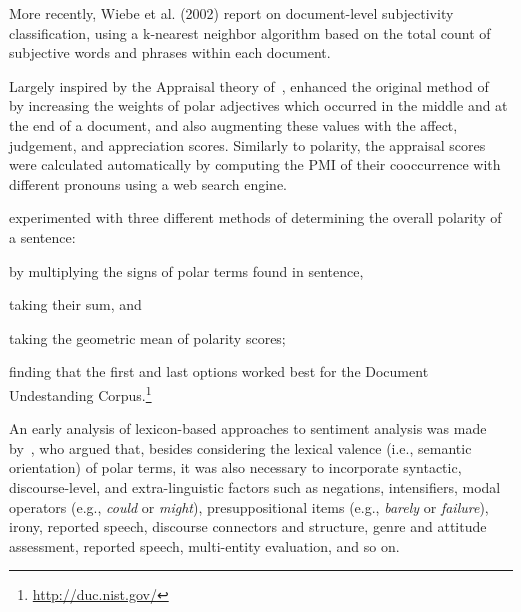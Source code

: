 \todo[inline]{}

More recently, Wiebe et al.  (2002) report on document-level
subjectivity classification, using a k-nearest neighbor algorithm
based on the total count of subjective words and phrases within each
document.


\todo[inline]{}

Largely inspired by the Appraisal theory of~\citet{Martin:00},
\citet{Taboada:04} enhanced the original method of~\citet{Turney:02}
by increasing the weights of polar adjectives which occurred in the
middle and at the end of a document, and also augmenting these values
with the affect, judgement, and appreciation scores.  Similarly to
polarity, the appraisal scores were calculated automatically by
computing the PMI of their cooccurrence with different pronouns using
a web search engine.

\citet{Kim:04} experimented with three different methods of
determining the overall polarity of a sentence:
\begin{inparaenum}[(i)]
  \item by multiplying the signs of polar terms found in sentence,
  \item taking their sum, and
  \item taking the geometric mean of polarity scores;
\end{inparaenum}
finding that the first and last options worked best for the Document
Undestanding Corpus.\footnote{\url{http://duc.nist.gov/}}

An early analysis of lexicon-based approaches to sentiment analysis
was made by~\citet{Polanyi:06}, who argued that, besides considering
the lexical valence (i.e., semantic orientation) of polar terms, it
was also necessary to incorporate syntactic, discourse-level, and
extra-linguistic factors such as negations, intensifiers, modal
operators (e.g., \emph{could} or \emph{might}), presuppositional items
(e.g., \emph{barely} or \emph{failure}), irony, reported speech,
discourse connectors and structure, genre and attitude assessment,
reported speech, multi-entity evaluation, and so on.

